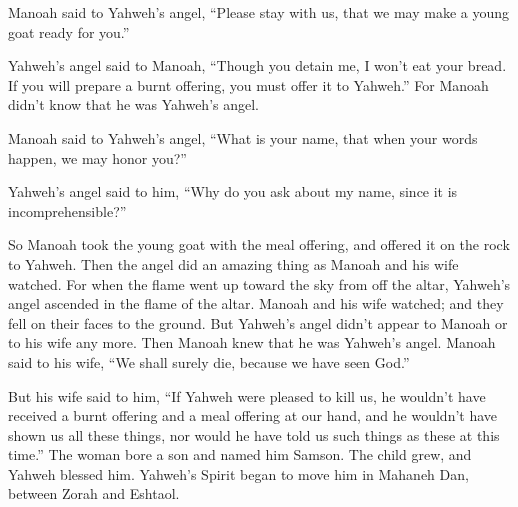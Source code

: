 {\par }{\PP {}Manoah said to Yahweh’s angel, “Please stay with us, that we may make a young goat ready for you.”
\par }{\PP {}Yahweh’s angel said to Manoah, “Though you detain me, I won’t eat your bread. If you will prepare a burnt offering, you must offer it to Yahweh.” For Manoah didn’t know that he was Yahweh’s angel.
\par }{\PP {}Manoah said to Yahweh’s angel, “What is your name, that when your words happen, we may honor you?”
\par }{\PP {}Yahweh’s angel said to him, “Why do you ask about my name, since it is incomprehensible?”
\par }{\PP {}So Manoah took the young goat with the meal offering, and offered it on the rock to Yahweh. Then the angel did an amazing thing as Manoah and his wife watched.
For when the flame went up toward the sky from off the altar, Yahweh’s angel ascended in the flame of the altar. Manoah and his wife watched; and they fell on their faces to the ground.
But Yahweh’s angel didn’t appear to Manoah or to his wife any more. Then Manoah knew that he was Yahweh’s angel.
Manoah said to his wife, “We shall surely die, because we have seen God.”
\par }{\PP {}But his wife said to him, “If Yahweh were pleased to kill us, he wouldn’t have received a burnt offering and a meal offering at our hand, and he wouldn’t have shown us all these things, nor would he have told us such things as these at this time.”
The woman bore a son and named him Samson. The child grew, and Yahweh blessed him.
Yahweh’s Spirit began to move him in Mahaneh Dan, between Zorah and Eshtaol.

}
